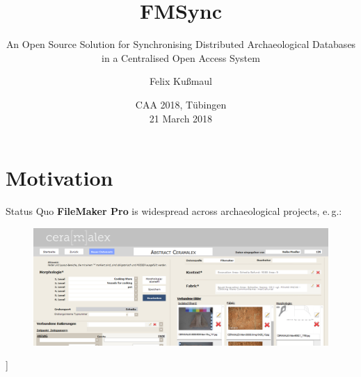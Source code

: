 \documentclass[xcolor=x11names, aspectratio=169,usenames,dvipsnames]{beamer}
\author[Felix Kußmaul]{\large Felix Kußmaul\inst{1}}
\title[FMSync]{\Large FMSync}
\subtitle{\normalsize An Open Source Solution for Synchronising Distributed Archaeological Databases in a Centralised Open Access System}
\institute[Cologne]{\inst{1} Archäologisches Institut, Universität zu Köln}
\date[\today]{\vspace*{1em}CAA 2018, Tübingen\\[.5em] 21 March 2018\vspace*{1em}}
\begin{document}
\begin{frame}[plain]
\titlepage
\end{frame}

\section{Motivation}

\begin{frame}{Status Quo}\large
\textbf{FileMaker Pro} is widespread across archaeological projects, e.\,g.:

\begin{figure}
	\includegraphics[width=\linewidth]{img/fm.png}	
\end{figure}]
\end{frame}
\end{document}
